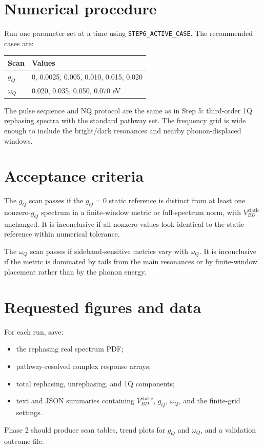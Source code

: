 \documentclass[11pt]{article}
\begin{document}
\section{Numerical procedure}
Run one parameter set at a time using \texttt{STEP6\_ACTIVE\_CASE}.  The
recommended cases are:
\begin{center}
\begin{tabular}{ll}
\toprule
Scan & Values \\
\midrule
$g_Q$ & 0, 0.0025, 0.005, 0.010, 0.015, 0.020 \\
$\omega_Q$ & 0.020, 0.035, 0.050, 0.070 eV \\
\bottomrule
\end{tabular}
\end{center}
The pulse sequence and NQ protocol are the same as in Step 5: third-order 1Q
rephasing spectra with the standard pathway set.  The frequency grid is wide
enough to include the bright/dark resonances and nearby phonon-displaced
windows.

\section{Acceptance criteria}
The $g_Q$ scan passes if the $g_Q=0$ static reference is distinct from at least
one nonzero-$g_Q$ spectrum in a finite-window metric or full-spectrum norm, with
$V_{BD}^{\mathrm{static}}$ unchanged.  It is inconclusive if all nonzero values
look identical to the static reference within numerical tolerance.

The $\omega_Q$ scan passes if sideband-sensitive metrics vary with
$\omega_Q$.  It is inconclusive if the metric is dominated by tails from the
main resonances or by finite-window placement rather than by the phonon energy.

\section{Requested figures and data}
For each run, save:
\begin{itemize}
\item the rephasing real spectrum PDF;
\item pathway-resolved complex response arrays;
\item total rephasing, unrephasing, and 1Q components;
\item text and JSON summaries containing $V_{BD}^{\mathrm{static}}$, $g_Q$,
$\omega_Q$, and the finite-grid settings.
\end{itemize}
Phase 2 should produce scan tables, trend plots for $g_Q$ and $\omega_Q$, and a
validation outcome file.
\end{document}
